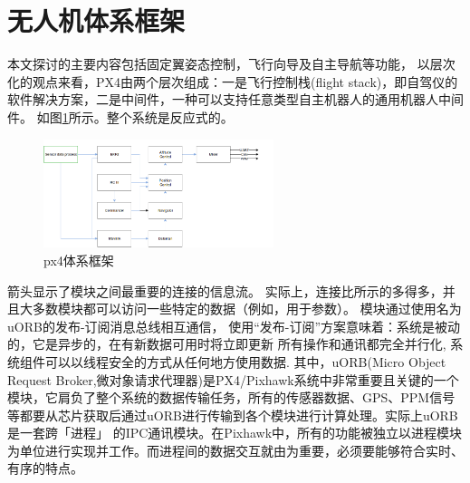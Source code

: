 \documentclass[UTF8,a4paper,10pt,nocolorlinks]{ctexart}
\makeatletter
\newenvironment{figurehere}
{\def\@captype{figure}}
{}
\makeatother
\begin{document}
    \section{无人机体系框架}
    本文探讨的主要内容包括固定翼姿态控制，飞行向导及自主导航等功能，
以层次化的观点来看，PX4由两个层次组成：一是飞行控制栈(flight stack)，即自驾仪的软件解决方案，二是中间件，一种可以支持任意类型自主机器人的通用机器人中间件。
如图\ref{px4}所示。整个系统是反应式的。
\begin{figure}[H]
    \centering
    \includegraphics[width=0.6\textwidth]{picture/PX4_Architecture_1.png}
    \caption{px4体系框架}
    \label{px4}
\end{figure}
箭头显示了模块之间最重要的连接的信息流。 实际上，连接比所示的多得多，并且大多数模块都可以访问一些特定的数据（例如，用于参数）。
模块通过使用名为uORB的发布-订阅消息总线相互通信，
使用“发布-订阅”方案意味着：系统是被动的，它是异步的，在有新数据可用时将立即更新
所有操作和通讯都完全并行化, 系统组件可以以线程安全的方式从任何地方使用数据.
其中，uORB(Micro Object Request Broker,微对象请求代理器)是PX4/Pixhawk系统中非常重要且关键的一个模块，它肩负了整个系统的数据传输任务，所有的传感器数据、GPS、PPM信号等都要从芯片获取后通过uORB进行传输到各个模块进行计算处理。实际上uORB是一套跨「进程」 的IPC通讯模块。在Pixhawk中，所有的功能被独立以进程模块为单位进行实现并工作。而进程间的数据交互就由为重要，必须要能够符合实时、有序的特点。

\end{document}
